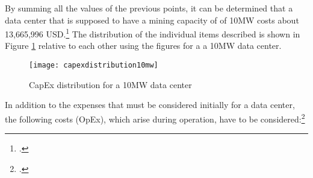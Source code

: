By summing all the values of the previous points, it can be determined that a data center that is supposed to have a mining capacity of
of 10MW costs about 13,665,996 USD.\footcite[Cf.][]{appendix:summaryofinvestment} The distribution of the individual items
described is shown in Figure \ref{figure:capexdistribution10mw} relative to each other using the figures for a
a 10MW data center.

\begin{figure}[H]
    \caption{CapEx distribution for a 10MW data center}
    \texttt{[image: capexdistribution10mw]}
    \label{figure:capexdistribution10mw}
\end{figure}

In addition to the expenses that must be considered initially for a data center, the following costs (\ac{OpEx}),
which arise during operation, have to be considered:\footcite[Cf.][]{appendix:opex}
